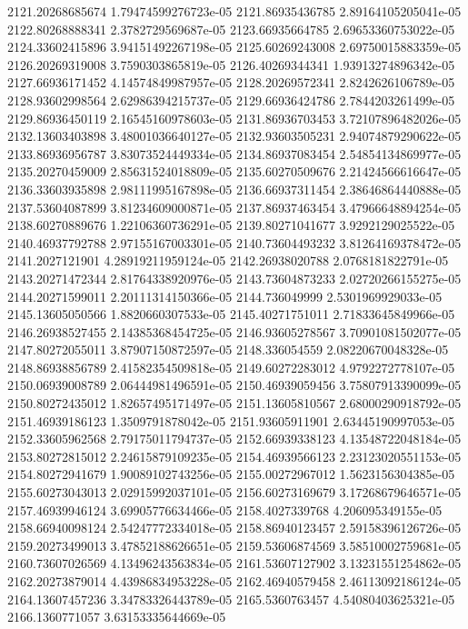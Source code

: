 {2121.20268685674 1.79474599276723e-05
2121.86935436785 2.89164105205041e-05
2122.80268888341 2.3782729569687e-05
2123.66935664785 2.69653360753022e-05
2124.33602415896 3.94151492267198e-05
2125.60269243008 2.69750015883359e-05
2126.20269319008 3.7590303865819e-05
2126.40269344341 1.93913274896342e-05
2127.66936171452 4.14574849987957e-05
2128.20269572341 2.8242626106789e-05
2128.93602998564 2.62986394215737e-05
2129.66936424786 2.7844203261499e-05
2129.86936450119 2.16545160978603e-05
2131.86936703453 3.72107896482026e-05
2132.13603403898 3.48001036640127e-05
2132.93603505231 2.94074879290622e-05
2133.86936956787 3.83073524449334e-05
2134.86937083454 2.54854134869977e-05
2135.20270459009 2.85631524018809e-05
2135.60270509676 2.21424566616647e-05
2136.33603935898 2.98111995167898e-05
2136.66937311454 2.38646864440888e-05
2137.53604087899 3.81234609000871e-05
2137.86937463454 3.47966648894254e-05
2138.60270889676 1.22106360736291e-05
2139.80271041677 3.9292129025522e-05
2140.46937792788 2.97155167003301e-05
2140.73604493232 3.81264169378472e-05
2141.2027121901 4.28919211959124e-05
2142.26938020788 2.0768181822791e-05
2143.20271472344 2.81764338920976e-05
2143.73604873233 2.02720266155275e-05
2144.20271599011 2.20111314150366e-05
2144.736049999 2.5301969929033e-05
2145.13605050566 1.8820660307533e-05
2145.40271751011 2.71833645849966e-05
2146.26938527455 2.14385368454725e-05
2146.93605278567 3.70901081502077e-05
2147.80272055011 3.87907150872597e-05
2148.336054559 2.08220670048328e-05
2148.86938856789 2.41582354509818e-05
2149.60272283012 4.9792272778107e-05
2150.06939008789 2.06444981496591e-05
2150.46939059456 3.75807913390099e-05
2150.80272435012 1.82657495171497e-05
2151.13605810567 2.68000290918792e-05
2151.46939186123 1.3509791878042e-05
2151.93605911901 2.63445190997053e-05
2152.33605962568 2.79175011794737e-05
2152.66939338123 4.13548722048184e-05
2153.80272815012 2.24615879109235e-05
2154.46939566123 2.23123020551153e-05
2154.80272941679 1.90089102743256e-05
2155.00272967012 1.5623156304385e-05
2155.60273043013 2.02915992037101e-05
2156.60273169679 3.17268679646571e-05
2157.46939946124 3.69905776634466e-05
2158.4027339768 4.206095349155e-05
2158.66940098124 2.54247772334018e-05
2158.86940123457 2.59158396126726e-05
2159.20273499013 3.47852188626651e-05
2159.53606874569 3.58510002759681e-05
2160.73607026569 4.13496243563834e-05
2161.53607127902 3.13231551254862e-05
2162.20273879014 4.43986834953228e-05
2162.46940579458 2.46113092186124e-05
2164.13607457236 3.34783326443789e-05
2165.5360763457 4.54080403625321e-05
2166.1360771057 3.63153335644669e-05
}
